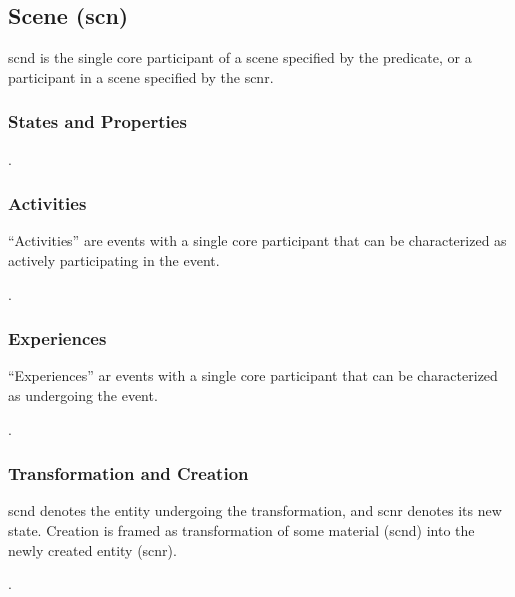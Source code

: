 \documentclass[a4paper]{article}
\begin{document}
\subsection{Scene (\textsf{scn})}
\label{sec:scn}

\textsf{scnd} is the single core participant of a scene specified by the
predicate, or a participant in a scene specified by the \textsf{scnr}.

\subsubsection{States and Properties}

\ex. 

\subsubsection{Activities}

``Activities'' are events with a single core participant that can be
characterized as actively participating in the event.

\ex. 

\subsubsection{Experiences}

``Experiences'' ar events with a single core participant that can be
characterized as undergoing the event.

\ex. 

\subsubsection{Transformation and Creation}

\textsf{scnd} denotes the entity undergoing the transformation, and
\textsf{scnr} denotes its new state. Creation is framed as transformation of
some material (\textsf{scnd}) into the newly created entity (\textsf{scnr}).

\ex. 
\end{document}
